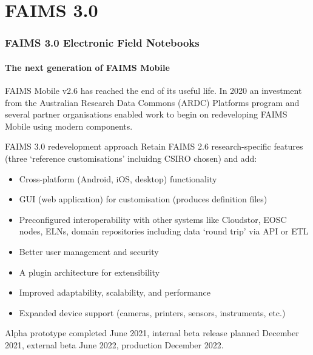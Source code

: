 

\section{FAIMS 3.0}

\begin{sectionframe} %
	\frametitle{FAIMS 3.0 Electronic Field Notebooks}
	\framesubtitle{The next generation of FAIMS Mobile}

    \vfill
    
    FAIMS Mobile v2.6 has reached the end of its useful life. In 2020 an investment from the Australian Research Data Commons (ARDC) Platforms program and several partner organisations enabled work to begin on redeveloping FAIMS Mobile using modern components.
\end{sectionframe}


\begin{frame}{FAIMS 3.0 redevelopment approach}
Retain FAIMS 2.6 research-specific features (three ‘reference customisations’ incluidng CSIRO chosen) and add:
    \begin{itemize}
        \item Cross-platform (Android, iOS, desktop) functionality
        \item GUI (web application) for customisation (produces definition files)
        \item Preconfigured interoperability with other systems like Cloudstor, EOSC nodes, ELNs, domain repositories including data ‘round trip’ via API or ETL
        \item Better user management and security
        \item A plugin architecture for extensibility
        \item Improved adaptability, scalability, and performance
        \item Expanded device support (cameras, printers, sensors, instruments, etc.)
    \end{itemize}
    \vfill
    Alpha prototype completed June 2021, internal beta release planned December 2021, external beta June 2022, production December 2022.
\end{frame}

